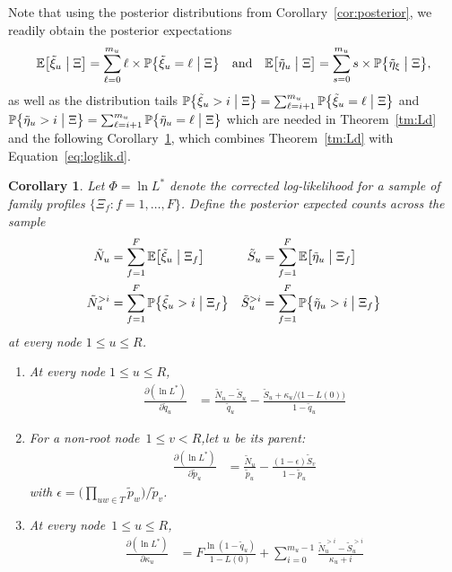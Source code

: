 \documentclass{elsarticle}
\newcommand{\condgen}[6]{{#1}#2 #5 #3 #6 #4}
\newcommand{\EXP}{\mathbb{E}}
\newcommand{\PROB}{\mathbb{P}}
\newcommand{\Probcsm}[2]{\condgen{\PROB}{\bigl\{}{\bigm|}{\bigr\}}{#1}{#2}}
\newcommand{\Expcsm}[2]{\condgen{\EXP}{\bigl[}{\bigm|}{\bigr]}{#1}{#2}}
\newtheorem{corollary}[theorem]{Corollary}
\newcommand{\nx}{u}
\newcommand{\ny}{v}
\newcommand{\nz}{w}
\newcommand{\fdf}{\Phi}
\begin{document}
Note that using the posterior distributions from Corollary~\ref{cor:posterior}, 
we readily obtain the posterior expectations
\[
\Expcsm{\tilde{\xi}_{\nx}}{\Xi} = \sum_{\ell=0}^{m_{\nx}} \ell  \times \Probcsm{\tilde{\xi}_{\nx}=\ell}{\Xi}%
\quad\text{and}\quad
\Expcsm{\tilde{\eta}_{\nx}}{\Xi} = \sum_{s=0}^{m_{\nx}} s \times \Probcsm{\tilde{\eta}_{\xi}}{\Xi},
\]
as well as the distribution tails $\Probcsm{\tilde{\xi}_{\nx}>i}{\Xi}=\sum_{\ell=i+1}^{m_{\nx}} \Probcsm{\tilde{\xi}_{\nx}=\ell}{\Xi}$
and $\Probcsm{\tilde{\eta}_{\nx}>i}{\Xi}=\sum_{\ell=i+1}^{m_{\nx}} \Probcsm{\tilde{\eta}_{\nx}=\ell}{\Xi}$
which are needed in Theorem~\ref{tm:Ld} and the following Corollary~\ref{cor:loglik.d}, which 
combines Theorem~\ref{tm:Ld} with Equation~\eqref{eq:loglik.d}.
\begin{corollary}\label{cor:loglik.d}
Let $\fdf=\ln L^*$ denote the corrected log-likelihood for a sample of family profiles $\{\Xi_f\colon f=1,\dotsc, F\}$.
Define the posterior expected counts across the sample
\begin{align*}
\tilde{N}_{\nx}& =\sum_{f=1}^F \Expcsm{\tilde{\xi}_{\nx}}{\Xi_f}
& \tilde{S}_{\nx}  & =\sum_{f=1}^F \Expcsm{\tilde{\eta}_{\nx}}{\Xi_f}
\\
\tilde{N}_{\nx}^{>i} & =\sum_{f=1}^F \Probcsm{\tilde{\xi}_{\nx}> i}{\Xi_f}
&
\tilde{S}_{\nx}^{> i}& =\sum_{f=1}^F \Probcsm{\tilde{\eta}_{\nx}> i}{\Xi_f}
\end{align*}
at every node $1\le \nx\le R$. 
\begin{enumerate}[label=(\roman*)] 
\item At every node $1\le \nx\le R$,  
\begin{align*}
\frac{\partial (\ln L^*)}{\partial \tilde{q}_{\nx}}
& = \frac{\tilde{N}_{\nx}-\tilde{S}_{\nx}}{\tilde{q}_{\nx}}-\frac{\tilde{S}_{\nx}+\kappa_{\nx}/\bigl(1-L(0)\bigr)}{1-\tilde{q}_{\nx}}
\end{align*}
\item For a non-root node~$1\le \ny<R$,let $\nx$ be its parent:
\begin{align*}
\frac{\partial (\ln L^*)}{\partial \tilde{p}_{\nx}}
& = \frac{\tilde{N}_{\nx}}{\tilde{p}_{\nx}}-\frac{(1-\epsilon)\tilde{S}_{\ny}}{1-\tilde{p}_{\nx}}
\end{align*}
with $\epsilon = \bigl(\prod_{\nx\nz\in T}\tilde{p}_{\nz}\bigr)/\tilde{p}_{\ny}$. 
\item At every node~$1\le \nx\le R$,
\begin{align*}
\frac{\partial (\ln L^*)}{\partial \kappa_{\nx}}
& = F\frac{\ln(1-\tilde{q}_{\nx})}{1-L(0)}+\sum_{i=0}^{m_{\nx}-1} \frac{\tilde{N}_{\nx}^{>i}-\tilde{S}_{\nx}^{>i}}{\kappa_{\nx}+i}
\end{align*}
\end{enumerate}
\end{corollary}
\end{document}
